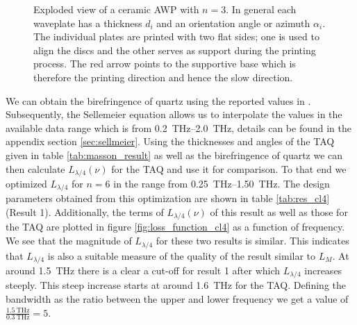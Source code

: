 \begin{figure}[ht]
    \centering
    
    \caption{Exploded view of a ceramic AWP with $n=3$. In general each waveplate has a thickness $d_i$ and an orientation angle or azimuth $\alpha_i$. The individual plates are printed with two flat sides; one is used to align the discs and the other serves as support during the printing process. The red arrow points to the supportive base which is therefore the printing direction and hence the slow direction.}
    \label{fig:ceramic_stack}
\end{figure}


We can obtain the birefringence of quartz using the reported values in \cite{DGrischkowsky1990}. Subsequently, the Sellemeier equation allows us to interpolate the values in the available data range which is from \SIrange{0.2}{2.0}{\tera \hertz}, details can be found in the appendix section \ref{sec:sellmeier}. Using the thicknesses and angles of the TAQ given in table \ref{tab:masson_result} as well as the birefringence of quartz we can then calculate $L_{\lambda/4}(\nu)$ for the TAQ and use it for comparison. To that end we optimized $L_{\lambda/4}$ for $n=6$ in the range from \SIrange{0.25}{1.50}{\tera \hertz}. The design parameters obtained from this optimization are shown in table \ref{tab:res_cl4} (Result 1). Additionally, the terms of $L_{\lambda/4}(\nu)$ of this result as well as those for the TAQ are plotted in figure \ref{fig:loss_function_cl4} as a function of frequency. We see that the magnitude of $L_{\lambda/4}$ for these two results is similar. This indicates that $L_{\lambda/4}$ is also a suitable measure of the quality of the result similar to $L_{M}$. At around \SI{1.5}{\tera \hertz} there is a clear a cut-off for result 1 after which $L_{\lambda/4}$ increases steeply. This steep increase starts at around \SI{1.6}{\tera \hertz} for the TAQ. Defining the bandwidth as the ratio between the upper and lower frequency we get a value of  $\frac{\SI{1.5}{\tera \hertz}}{\SI{0.3}{\tera \hertz}}=5$. 

\begin{table}[ht]
    \centering
    
    \caption{Design parameters for result 1 and 2. Both results are obtained through the optimization of $L_{\lambda/4}$ for $n=6$. In the case of result 1 the frequency range for the optimization was limited to \SIrange[range-phrase=-, range-units=single]{0.25}{1.50}{\tera \hertz} while for result 2 the range was set to \SIrange[range-phrase=-, range-units=single]{0.50}{2.25}{\tera \hertz}.}
    \label{tab:res_cl4}
\end{table}

